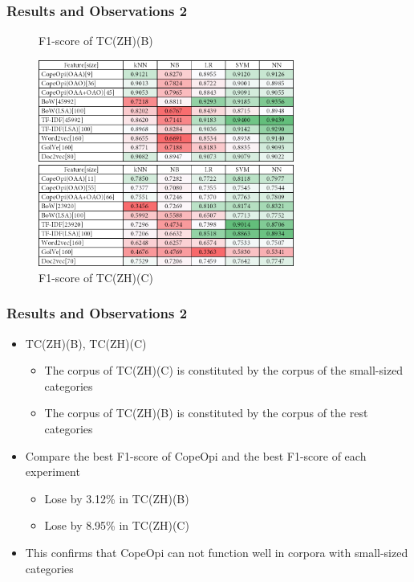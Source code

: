 \documentclass[mathserif]{beamer}
\newcommand\expfigvspace{-2.5ex}
\begin{document}
\begin{frame}
\frametitle{Results and Observations 2}
	\vspace{\expfigvspace}
	\begin{figure}
	\centering
	\caption{F1-score of TC(ZH)(B)}
	\includegraphics[width=0.75\textwidth]{./figure/02B2.png}
	\caption{F1-score of TC(ZH)(C)}
	\includegraphics[width=0.75\textwidth]{./figure/02B3.png}
	\end{figure}
\end{frame}
\begin{frame}
\frametitle{Results and Observations 2}
	\begin{itemize}
	\item TC(ZH)(B), TC(ZH)(C)
		\begin{itemize}
		\item The corpus of TC(ZH)(C) is constituted by the corpus of the small-sized categories
		\item The corpus of TC(ZH)(B) is constituted by the corpus of the rest categories
		\end{itemize}
	\item Compare the best F1-score of CopeOpi and the best F1-score of each experiment
		\begin{itemize}
		\item Lose by 3.12\% in TC(ZH)(B)
		\item Lose by 8.95\% in TC(ZH)(C)
		\end{itemize}
	\item This confirms that CopeOpi can not function well in corpora with small-sized categories
	\end{itemize}
\end{frame}
\end{document}
